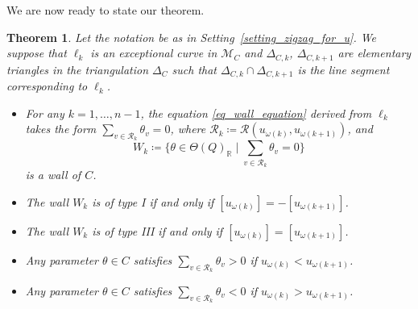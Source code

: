 \documentclass[pdftex]{sigma}
\numberwithin{equation}{section}
\newtheorem{Theorem}{Theorem}[section]
\theoremstyle{definition}
\newcommand{\RR}{\mathbb{R}}
\newcommand{\calM}{\mathcal{M}}
\newcommand{\calR}{\mathcal{R}}
\newcommand{\typeIII}{{\rm I\hspace{-0.7pt}I\hspace{-0.7pt}I}}
\newcommand{\permII}{\omega}
\begin{document}
We are now ready to state our theorem.

\begin{Theorem}\label{thm_main_wall}
Let the notation be as in Setting~{\rm \ref{setting_zigzag_for_u}}.
We suppose that $\ell_k$ is an exceptional curve in $\calM_C$
and $\Delta_{C,k}$, $\Delta_{C,k+1}$ are elementary triangles in the triangulation $\Delta_C$ such that $\Delta_{C,k}\cap \Delta_{C,k+1}$
is the line segment corresponding to $\ell_k$.
\begin{itemize}\itemsep=0pt
\item[$(1)\hphantom{{}'}$]
For any $k=1, \dots, n-1$, the equation \eqref{eq_wall_equation} derived from $\ell_k$ takes the form
$\sum_{v\in \calR_k}\theta_v=0$, where $\calR_k\coloneqq\calR(u_{\permII(k)}, u_{\permII(k+1)})$, and
\[
W_{k}\coloneqq\biggl\{\theta\in\Theta(Q)_\RR \mid \sum_{v\in \calR_k}\theta_v=0\biggr\}
\]
is a wall of $C$.
\item[$(2)\hphantom{{}'}$] The wall $W_k$ is of type {\rm I} if and only if $[u_{\permII(k)}]= -[u_{\permII(k+1)}]$.
\item[$(2)'$] The wall $W_k$ is of type {\typeIII} if and only if $[u_{\permII(k)}]=[u_{\permII(k+1)}]$.
\item[$(3)\hphantom{{}'}$] Any parameter $\theta\in C$ satisfies $\sum_{v\in \calR_k}\theta_v>0$ if $u_{\permII(k)}< u_{\permII(k+1)}$.
\item[$(3)'$] Any parameter $\theta\in C$ satisfies $\sum_{v\in \calR_k}\theta_v<0$ if $u_{\permII(k)}> u_{\permII(k+1)}$.
\end{itemize}
\end{Theorem}
\end{document}
